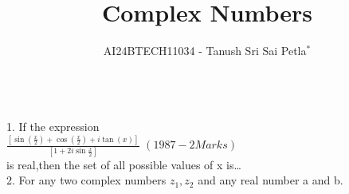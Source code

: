 \documentclass[journal,12pt,twocolumn]{IEEEtran}
\theoremstyle{remark}
\begin{document}

\vspace{3cm}

\title{Complex Numbers}
\author{AI24BTECH11034 - Tanush Sri Sai Petla$^{*}$%
}

\\
1. If the expression    \\        

$\frac{[\sin(\frac{x}{2}) + \cos(\frac{x}{2}) + i\tan(x)]}{[1+2i\sin\frac{x}{2}]}   $  \hfill$(1987 - 2 Marks)$\\
is real,then the set of all possible values of x is\ldots\\
2.  For any two complex numbers $z_1,z_2$ and any real number a and b.
\end{document}
